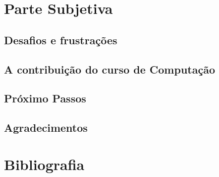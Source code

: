 \documentclass[a4paper,12pt]{article}
\begin{document}
\section{Parte Subjetiva}


\subsection{Desafios e frustrações}
\subsection{A contribuição do curso de Computação}
\subsection{Próximo Passos}
\subsection{Agradecimentos}






\section{Bibliografia}












 \singlespacing   %

\end{document}
